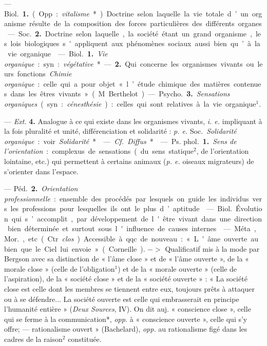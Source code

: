 \begin{itemize}[leftmargin=1cm, label=, itemsep=1pt]
 —  \si{Biol.} {\bf 1.} (Opp. :
{\it vitalisme}*). Doctrine selon laquelle la vie totale d’un organisme
résulte de la composition des forces particulières des différents organes. —
\si{Soc.} {\bf 2.} Doctrine selon laquelle, la société étant un grand
organisme, les lois biologiques s'appliquent aux phénomènes sociaux aussi
bien qu’à la vie organique.

 — \si{Biol.} {\bf 1.} {\it Vie organique} : syn. :
{\it végétative}*. — {\bf 2.} Qui concerne
les organismes vivants ou leurs fonctions. {\it Chimie organique} : celle qui
a pour objet « l’étude chimique des matières contenues dans les êtres
vivants » (M. Berthelot).

— \si{Psycho.} {\bf 3.} {\it Sensations organiques} (syn. :
{\it cénesthésie}) : celles qui sont relatives à la vie organique$^1$.

— {\it Ext.} {\bf 4.} Analogue à ce qui existe dans les organismes vivants,
{\it i. e.} impliquant à la fois pluralité et unité, différenciation et
solidarité : {\it p. e.} \si{Soc.} {\it Solidarité organique} : voir
{\it Solidarité}*.

 — {\it Cf.} {\it Diffus}*.

 — \si{Ps. phol.} {\bf 1.} {\it Sens de l'orientation} :
complexus de sensations (du sens statique$^2$, de l’orientation lointaine,
etc.) qui permettent à certains animaux ({\it p. e.} oiseaux migrateurs) de
s'orienter dans l’espace.

— \si{Péd.} {\bf 2.} {\it Orientation professionnelle} : ensemble des
procédés par lesquels on guide les individus vers les professions pour
lesquelles ils ont le plus d’aptitude.

 — \si{Biol.} Évolution qui s’accomplit, par développement de
l'être vivant dans une direction bien déterminée et surtout sous l'influence
de causes internes.

 — Méta, \si{Mor.}, etc. (Ctr. {\it clos}). Accessible à qqc. de
nouveau : « L'âme ouverte au bien que le Ciel lui envoie » (Corneille). $->$
Qualificatif mis à la mode par Bergson avec sa distinction de « l’âme close »
et de « l'âme ouverte », de la « morale close » (celle de l'obligation$^1$)
et de la « morale ouverte » (celle de l’aspiration), de la « société close »
et de la « société ouverte » : « La société close est celle dont les membres
se tiennent entre eux, toujours prêts à attaquer ou à se défendre... La
société ouverte est celle qui embrasserait en principe l'humanité entière
» ({\it Deux Sources}, IV). On dit auj. « conscience close », celle qui se
ferme à la communication*, {\it opp.} à « conscience ouverte », celle qui s’y
offre; — rationalisme ouvert » (Bachelard), {\it opp.} au rationalisme figé
dans les cadres de la raison$^2$ constituée.

	\end{itemize}
